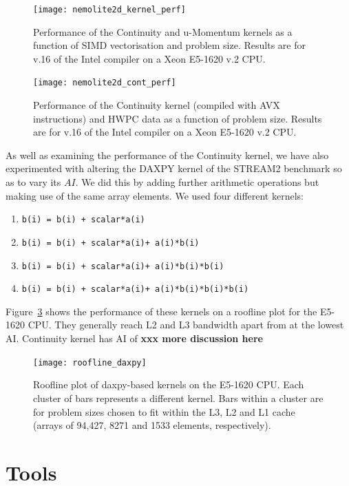 \documentclass[12pt]{article}
\begin{document}
\begin{figure}
  \centering
  \texttt{[image: nemolite2d\_kernel\_perf]}
  \caption{Performance of the Continuity and u-Momentum kernels as a
    function of SIMD vectorisation and problem size. Results are for
    v.16 of the Intel compiler on a Xeon E5-1620 v.2 CPU.}
  \label{FIG_kernel_perf}
\end{figure}

\begin{figure}
  \centering
  \texttt{[image: nemolite2d\_cont\_perf]}
  \caption{Performance of the Continuity kernel (compiled with AVX
    instructions) and HWPC data as a function of problem size. Results
    are for v.16 of the Intel compiler on a Xeon E5-1620 v.2 CPU.}
  \label{FIG_cont_perf}
\end{figure}

As well as examining the performance of the Continuity kernel, we have
also experimented with altering the DAXPY kernel of the STREAM2
benchmark so as to vary its $AI$. We did this by adding further
arithmetic operations but making use of the same array
elements. We used four different kernels:
\begin{enumerate}
\item {\tt b(i) = b(i) + scalar*a(i)}
\item {\tt b(i) = b(i) + scalar*a(i)+ a(i)*b(i)}
\item {\tt b(i) = b(i) + scalar*a(i)+ a(i)*b(i)*b(i)}
\item {\tt b(i) = b(i) + scalar*a(i)+ a(i)*b(i)*b(i)*b(i)}
\end{enumerate}
Figure~\ref{FIG_daxpy_roofline} shows the performance of these kernels
on a roofline plot for the E5-1620 CPU. They generally reach L2 and L3
bandwidth apart from at the lowest AI. Continuity kernel has AI of
{\bf xxx more discussion here}

\begin{figure}
\texttt{[image: roofline\_daxpy]}
\caption{Roofline plot of daxpy-based kernels on the E5-1620 CPU. Each
  cluster of bars represents a different kernel. Bars within a cluster
  are for problem sizes chosen to fit within the L3, L2 and L1 cache
  (arrays of 94,427, 8271 and 1533 elements, respectively). }
\label{FIG_daxpy_roofline}
\end{figure}

\section{Tools}
\end{document}
